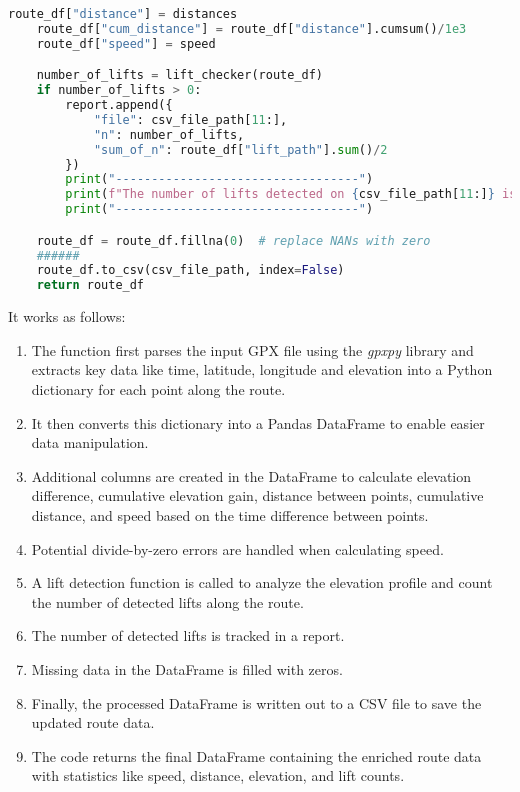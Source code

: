 \begin{lstlisting}[language=Python]
    route_df["distance"] = distances
    route_df["cum_distance"] = route_df["distance"].cumsum()/1e3
    route_df["speed"] = speed

    number_of_lifts = lift_checker(route_df)
    if number_of_lifts > 0:
        report.append({
            "file": csv_file_path[11:],
            "n": number_of_lifts,
            "sum_of_n": route_df["lift_path"].sum()/2
        })
        print("----------------------------------")
        print(f"The number of lifts detected on {csv_file_path[11:]} is {number_of_lifts}")
        print("----------------------------------")

    route_df = route_df.fillna(0)  # replace NANs with zero
    ######
    route_df.to_csv(csv_file_path, index=False)
    return route_df
\end{lstlisting}

It works as follows:
\begin{enumerate}
    \item The function first parses the input GPX file using the \textit{gpxpy} library and extracts key data like time, latitude, longitude and elevation into a Python dictionary for each point along the route.
    
    \item It then converts this dictionary into a Pandas DataFrame to enable easier data manipulation.
    
    \item Additional columns are created in the DataFrame to calculate elevation difference, cumulative elevation gain, distance between points, cumulative distance, and speed based on the time difference between points.
    
    \item Potential divide-by-zero errors are handled when calculating speed.
    
    \item A lift detection function is called to analyze the elevation profile and count the number of detected lifts along the route.
    
    \item The number of detected lifts is tracked in a report.
    
    \item Missing data in the DataFrame is filled with zeros.
    
    \item Finally, the processed DataFrame is written out to a CSV file to save the updated route data.
    
    \item The code returns the final DataFrame containing the enriched route data with statistics like speed, distance, elevation, and lift counts.
\end{enumerate}


